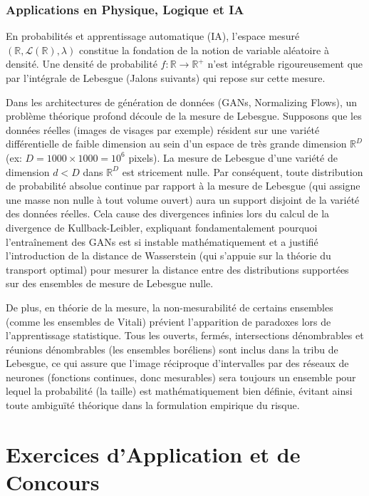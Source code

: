 \documentclass[11pt,a4paper]{article}
\begin{document}
\section{Applications en Physique, Logique et IA}

En probabilités et apprentissage automatique (IA), l'espace mesuré $(\mathbb{R}, \mathcal{L}(\mathbb{R}), \lambda)$ constitue la fondation de la notion de variable aléatoire à densité. Une densité de probabilité $f : \mathbb{R} \to \mathbb{R}^+$ n'est intégrable rigoureusement que par l'intégrale de Lebesgue (Jalons suivants) qui repose sur cette mesure.

Dans les architectures de génération de données (GANs, Normalizing Flows), un problème théorique profond découle de la mesure de Lebesgue. Supposons que les données réelles (images de visages par exemple) résident sur une variété différentielle de faible dimension au sein d'un espace de très grande dimension $\mathbb{R}^D$ (ex: $D = 1000 \times 1000 = 10^6$ pixels). La mesure de Lebesgue d'une variété de dimension $d < D$ dans $\mathbb{R}^D$ est stricement nulle. Par conséquent, toute distribution de probabilité absolue continue par rapport à la mesure de Lebesgue (qui assigne une masse non nulle à tout volume ouvert) aura un support disjoint de la variété des données réelles. Cela cause des divergences infinies lors du calcul de la divergence de Kullback-Leibler, expliquant fondamentalement pourquoi l'entraînement des GANs est si instable mathématiquement et a justifié l'introduction de la distance de Wasserstein (qui s'appuie sur la théorie du transport optimal) pour mesurer la distance entre des distributions supportées sur des ensembles de mesure de Lebesgue nulle.

De plus, en théorie de la mesure, la non-mesurabilité de certains ensembles (comme les ensembles de Vitali) prévient l'apparition de paradoxes lors de l'apprentissage statistique. Tous les ouverts, fermés, intersections dénombrables et réunions dénombrables (les ensembles boréliens) sont inclus dans la tribu de Lebesgue, ce qui assure que l'image réciproque d'intervalles par des réseaux de neurones (fonctions continues, donc mesurables) sera toujours un ensemble pour lequel la probabilité (la taille) est mathématiquement bien définie, évitant ainsi toute ambiguïté théorique dans la formulation empirique du risque.


\part{Exercices d'Application et de Concours}
\end{document}
